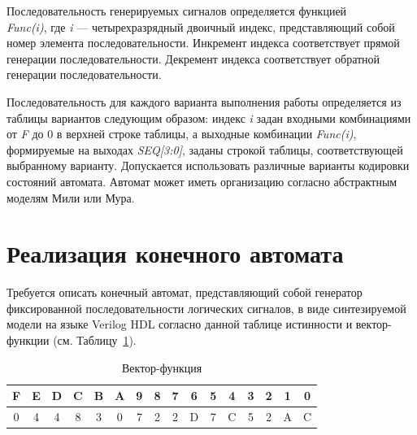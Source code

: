 Последовательность генерируемых сигналов определяется функцией~\\\textit{Func(i)}, где \textit{i} --- четырехразрядный двоичный индекс, представляющий собой номер элемента
последовательности. 
Инкремент индекса соответствует прямой генерации последовательности.
Декремент индекса соответствует обратной генерации последовательности.

Последовательность для каждого варианта выполнения работы определяется из
таблицы вариантов следующим образом: индекс \textit{i} задан входными комбинациями от \textit{F} до
0 в верхней строке таблицы, а выходные комбинации \textit{Func(i)}, формируемые на выходах
\textit{SEQ[3:0]}, заданы строкой таблицы, соответствующей выбранному варианту.
Допускается использовать различные варианты кодировки состояний автомата.
Автомат может иметь организацию согласно абстрактным моделям Мили или Мура.

\section {Реализация конечного автомата}
Требуется описать конечный автомат, представляющий собой генератор
фиксированной последовательности логических сигналов, в виде синтезируемой модели
на языке Verilog HDL согласно данной таблице истинности и вектор-функции (см. Таблицу~\ref{tab:func-vector}).

\begin{table}[h!]
	\centering
	\caption{Вектор-функция}
		\begin{tabular}{|c|c|c|c|c|c|c|c|c|c|c|c|c|c|c|c|}
			\hline
			F & E & D & C & B & A & 9 & 8 & 7 & 6 & 5 & 4 & 3 & 2 & 1 & 0 \\ \hline\hline
			0 & 4 & 4 & 8 & 3 & 0 & 7 & 2 & 2 & D & 7 & C & 5 & 2 & A & C \\ \hline
		\end{tabular}
		\label{tab:func-vector}
\end{table}

